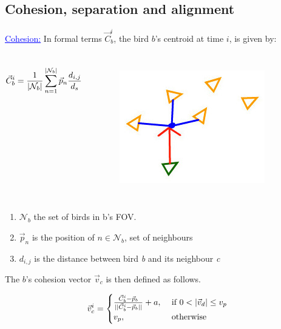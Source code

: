 \documentclass{beamer}
\begin{document}
\subsection{Cohesion, separation and alignment }
\begin{frame}
\textcolor{blue}{\underline{Cohesion:}}
In formal terms \(\vec{C}_b^i\), the bird $b$'s centroid at time $i$, is given by:
\begin{center}
\begin{columns}


\begin{align}
 \vec{C}_b^i = \frac{1}{|\mathcal{N}_b|}\sum_{n=1}^{|\mathcal{N}_b|}{\vec{p}_n  \frac{d_{i,j}}{d_s}} \notag
\end{align}

\begin{figure}[h!]
		\includegraphics[scale=0.4]{images/cohesion}
		\label{fig:vFOV}
\end{figure}	


\end{columns}
\begin{enumerate}
\item \(\mathcal{N}_b\) the set of birds in b's FOV.
\item \(\vec{p}_n\) is the position of $n \in \mathcal{N}_b$, set of neighbours
\item \(d_{i,j}\) is the distance between bird \emph{b} and its neighbour
	\emph{c}

\end{enumerate}

The $b$'s cohesion vector \(\vec{v}_c\) is then defined as follows.

\begin{equation}
\vec{v}_c^i =
	\begin{cases}
	 \frac{\vec{C}_b^i - \vec{p}_b}{|| \vec{C}_b^i - \vec{p}_b ||} +
		a, &\mbox{ if } 0 < |\vec{v}_d| \leq v_p \\
		v_p, &\mbox{ otherwise }  \notag
	\end{cases}
\end{equation}

\end{center}

\end{frame}
\end{document}
